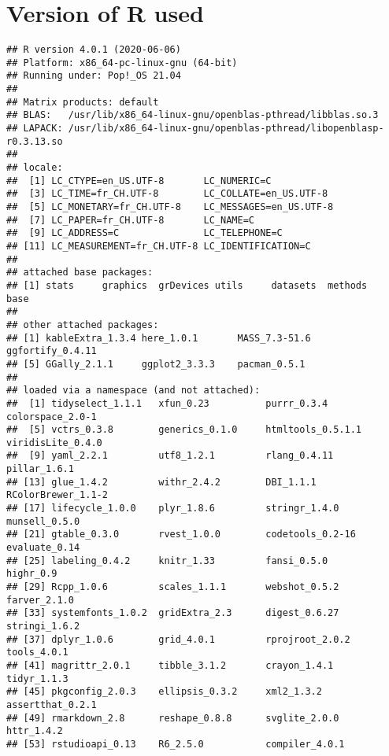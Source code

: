 \documentclass[
  11pt,
]{article}
\begin{document}
\hypertarget{version-of-r-used}{%
\section{Version of R used}\label{version-of-r-used}}

\begin{verbatim}
## R version 4.0.1 (2020-06-06)
## Platform: x86_64-pc-linux-gnu (64-bit)
## Running under: Pop!_OS 21.04
## 
## Matrix products: default
## BLAS:   /usr/lib/x86_64-linux-gnu/openblas-pthread/libblas.so.3
## LAPACK: /usr/lib/x86_64-linux-gnu/openblas-pthread/libopenblasp-r0.3.13.so
## 
## locale:
##  [1] LC_CTYPE=en_US.UTF-8       LC_NUMERIC=C              
##  [3] LC_TIME=fr_CH.UTF-8        LC_COLLATE=en_US.UTF-8    
##  [5] LC_MONETARY=fr_CH.UTF-8    LC_MESSAGES=en_US.UTF-8   
##  [7] LC_PAPER=fr_CH.UTF-8       LC_NAME=C                 
##  [9] LC_ADDRESS=C               LC_TELEPHONE=C            
## [11] LC_MEASUREMENT=fr_CH.UTF-8 LC_IDENTIFICATION=C       
## 
## attached base packages:
## [1] stats     graphics  grDevices utils     datasets  methods   base     
## 
## other attached packages:
## [1] kableExtra_1.3.4 here_1.0.1       MASS_7.3-51.6    ggfortify_0.4.11
## [5] GGally_2.1.1     ggplot2_3.3.3    pacman_0.5.1    
## 
## loaded via a namespace (and not attached):
##  [1] tidyselect_1.1.1   xfun_0.23          purrr_0.3.4        colorspace_2.0-1  
##  [5] vctrs_0.3.8        generics_0.1.0     htmltools_0.5.1.1  viridisLite_0.4.0 
##  [9] yaml_2.2.1         utf8_1.2.1         rlang_0.4.11       pillar_1.6.1      
## [13] glue_1.4.2         withr_2.4.2        DBI_1.1.1          RColorBrewer_1.1-2
## [17] lifecycle_1.0.0    plyr_1.8.6         stringr_1.4.0      munsell_0.5.0     
## [21] gtable_0.3.0       rvest_1.0.0        codetools_0.2-16   evaluate_0.14     
## [25] labeling_0.4.2     knitr_1.33         fansi_0.5.0        highr_0.9         
## [29] Rcpp_1.0.6         scales_1.1.1       webshot_0.5.2      farver_2.1.0      
## [33] systemfonts_1.0.2  gridExtra_2.3      digest_0.6.27      stringi_1.6.2     
## [37] dplyr_1.0.6        grid_4.0.1         rprojroot_2.0.2    tools_4.0.1       
## [41] magrittr_2.0.1     tibble_3.1.2       crayon_1.4.1       tidyr_1.1.3       
## [45] pkgconfig_2.0.3    ellipsis_0.3.2     xml2_1.3.2         assertthat_0.2.1  
## [49] rmarkdown_2.8      reshape_0.8.8      svglite_2.0.0      httr_1.4.2        
## [53] rstudioapi_0.13    R6_2.5.0           compiler_4.0.1
\end{verbatim}
\end{document}
